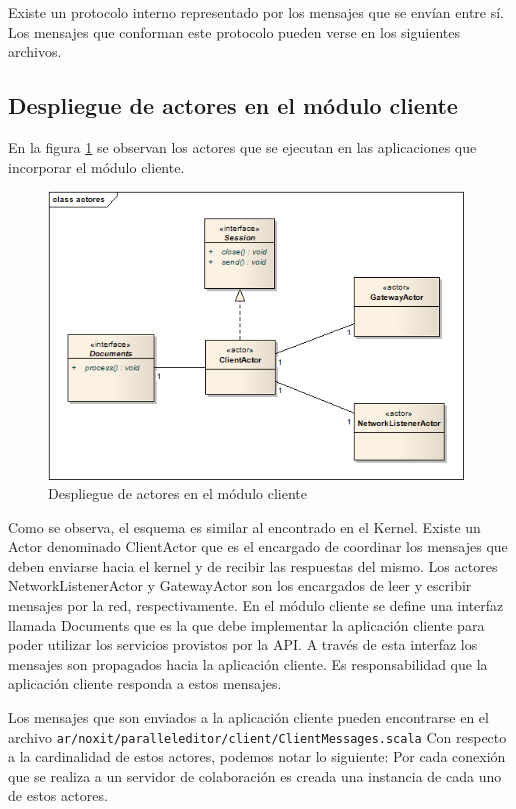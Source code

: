 \documentclass[12pt,a4paper]{article}
\begin{document}
Existe un protocolo interno representado por los mensajes que se envían entre sí. Los mensajes que conforman este protocolo
pueden verse en los siguientes archivos.

\subsection{Despliegue de actores en el módulo cliente}
En la figura \ref{actores-cliente} se observan los actores que se ejecutan en las aplicaciones que incorporar el módulo cliente.

	\begin{figure}[!ht]
		\begin{center}
			\includegraphics[width=11cm]{actores-cliente.png}
			\caption{\label{actores-cliente} Despliegue de actores en el módulo cliente }
		\end{center}
	\end{figure}

Como se observa, el esquema es similar al encontrado en el Kernel. Existe un Actor denominado ClientActor que es el
encargado de coordinar los mensajes que deben enviarse hacia el kernel y de recibir las respuestas del mismo.
Los actores NetworkListenerActor y GatewayActor son los encargados de leer y escribir mensajes por la red, respectivamente.
En el módulo cliente se define una interfaz llamada Documents que es la que debe implementar la aplicación cliente para poder
utilizar los servicios provistos por la API.
A través de esta interfaz los mensajes son propagados hacia la aplicación cliente. Es responsabilidad que la aplicación cliente
responda a estos mensajes.

Los mensajes que son enviados a la aplicación cliente pueden encontrarse en el archivo 
\texttt{ar/noxit/paralleleditor/client/ClientMessages.scala}
Con respecto a la cardinalidad de estos actores, podemos notar lo siguiente:
Por cada conexión que se realiza a un servidor de colaboración es creada una instancia de cada uno de estos actores.
\end{document}
